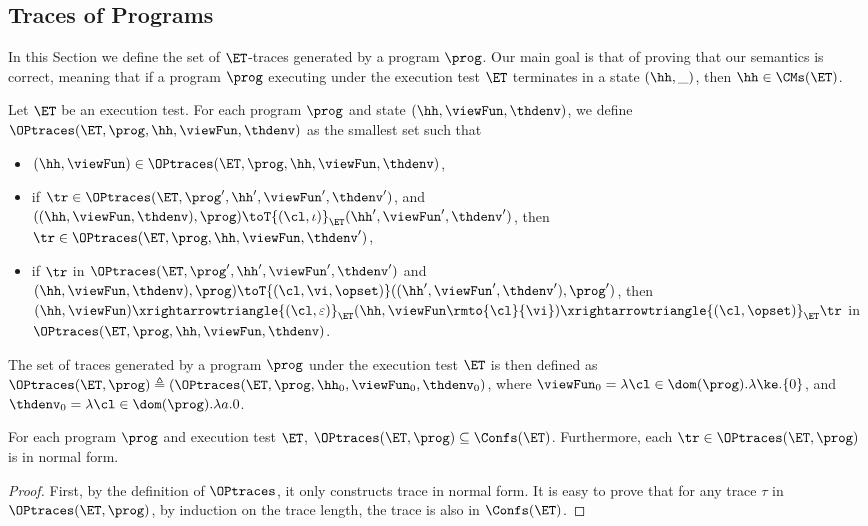 \subsection{Traces of Programs}
\label{sec:kv-sound-complete-theorem}
In this Section we define the set of $\ET$-traces generated by a program 
$\prog$. Our main goal is that of proving that our semantics is correct, 
meaning that if a program $\prog$ executing under the execution 
test $\ET$ terminates in a state $(\hh, \_)$, then $\hh \in \CMs(\ET)$. 

\begin{definition}
Let $\ET$ be an execution test. For each program $\prog$ and state 
$(\hh, \viewFun, \thdenv)$, we define $\OPtraces(\ET, \prog, \hh, \viewFun, \thdenv)$ 
as the smallest set such that 
\begin{itemize}
\item $(\hh, \viewFun) \in \OPtraces(\ET, \prog, \hh, \viewFun, \thdenv)$, 
\item if $\tr \in \OPtraces(\ET, \prog', \hh', \viewFun',\thdenv')$, 
and $((\hh, \viewFun, \thdenv) , \prog) \toT{(\cl, \iota)}_{\ET} (\hh', \viewFun', \thdenv')$, 
then $\tr \in \OPtraces(\ET, \prog, \hh, \viewFun, \thdenv')$, 
\item if $\tr$ in $\OPtraces(\ET, \prog', \hh', \viewFun', \thdenv')$ and 
\newline $(\hh, \viewFun, \thdenv), \prog) \toT{(\cl, \vi, \opset)} ((\hh', \viewFun', \thdenv'), \prog')$,  
then $(\hh, \viewFun) \xrightarrowtriangle{(\cl, \varepsilon)}_{\ET} (\hh, \viewFun\rmto{\cl}{\vi}) 
\xrightarrowtriangle{(\cl, \opset)}_{\ET} \tr$ in $\OPtraces(\ET, \prog, \hh, \viewFun, \thdenv)$. 
\end{itemize}

The set of traces generated by a program $\prog$ under the execution test $\ET$ is 
then defined as $\OPtraces(\ET, \prog) \triangleq (\OPtraces(\ET, \prog, \hh_{0}, \viewFun_{0}, 
\thdenv_{0})$, where $\viewFun_{0} = \lambda \cl \in \dom(\prog).\lambda \ke.\{0\}$, and 
$\thdenv_{0} = \lambda \cl \in \dom(\prog).\lambda a.0$.

\end{definition}

\begin{proposition}
    \label{prop:program-trace-in-et-trace}
For each program $\prog$ and execution test $\ET$, 
$\OPtraces(\ET, \prog) \subseteq \Confs(\ET)$. 
Furthermore, each $\tr \in \OPtraces(\ET, \prog)$ is in normal form. 
\end{proposition}
\begin{proof}
    First, by the definition of \( \OPtraces \), 
    it only constructs trace in normal form.
    It is easy to prove that for any trace \( \tau \) in \( \OPtraces(\ET, \prog) \), by induction on the trace length,
    the trace is also in \( \Confs(\ET) \).
\end{proof}

